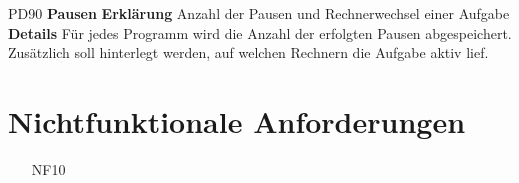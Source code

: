 \documentclass[a4paper,12pt]{article}
\begin{document}
\begin{itemize}[nosep]
\begin{minipage}[t]{\linewidth}
\item[PD90] \textbf{Pausen}
\subitem \textbf{Erklärung} Anzahl der Pausen und Rechnerwechsel einer Aufgabe
\subitem \textbf{Details} Für jedes Programm wird die Anzahl der erfolgten Pausen abgespeichert.\newline
Zusätzlich soll hinterlegt werden, auf welchen Rechnern die Aufgabe aktiv lief.
\end{minipage}

\end{itemize}
\newpage

\section{Nichtfunktionale Anforderungen}
\begin{itemize}[nosep]
\leftskip=0.5cm

\begin{comment}

\begin{minipage}[t]{\linewidth}
\item[FA00] \textbf{<Titel>}
\subitem \textbf{Erklärung} <In ca. 3 Zeilen eine grobe Beschreibung geben>
\subitem \textbf{Wichtigkeit} <Wie relevant ist es für uns, diese Anforderung zu erfüllen>
\subitem \textbf{Bezug} <Welcher funktionalen Anforderung ist diese Anforderung zuzuordnen>
\subitem \textbf{Details} <Ausführliche Beschreibung dieser nichtfunktionalen Anforderung>
\end{minipage}
\pagebreak

\end{comment}

\item[NF10]
\end{itemize}





\end{document}
